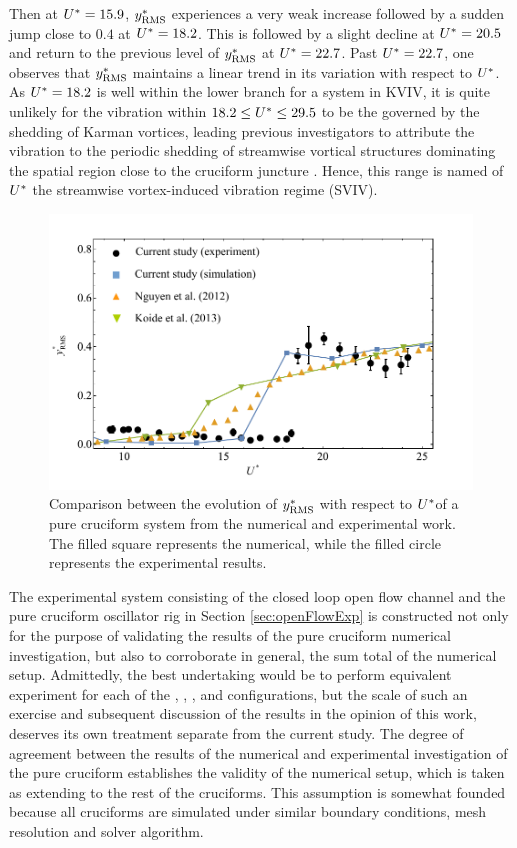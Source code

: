 \documentclass[oneside]{utmthesis}
\begin{document}
Then at $U^{*} = 15.9$, $y^{*}_{\text{RMS}}$ experiences a very weak increase followed by a sudden jump close to $0.4$ at $U^{*} = 18.2$. This is followed by a slight decline at $U^{*} = 20.5$ and return to the previous level of $y^{*}_{\text{RMS}}$ at $U^{*} = 22.7$. Past $U^{*} = 22.7$, one observes that $y^{*}_{\text{RMS}}$ maintains a linear trend in its variation with respect to $U^{*}$. As $U^{*} = 18.2$ is well within the lower branch for a system in KVIV, it is quite unlikely for the vibration within $18.2 \leq U^{*} \leq 29.5$ to be the governed by the shedding of Karman vortices, leading previous investigators to attribute the vibration to the periodic shedding of streamwise vortical structures dominating the spatial region close to the cruciform juncture \citep{Shirakashi1989,Hemsuwan2018b,Hemsuwan2018d}. Hence, this range is named of $U^{*}$ the streamwise vortex-induced vibration regime (SVIV).

\begin{figure}
  \centering
  \includegraphics[width=1\textwidth]{figs/expCompareAmp}
  \caption{Comparison between the evolution of $y^{*}_{\text{RMS}}$ with respect to $U^{*}$of a pure cruciform system from the numerical and experimental work. The filled square represents the numerical, while the filled circle represents the experimental results.}
  \label{fig:expCompareAmp}
\end{figure}

The experimental system consisting of the closed loop open flow channel and the pure cruciform oscillator rig in Section \ref{sec:openFlowExp} is constructed not only for the purpose of validating the results of the pure cruciform numerical investigation, but also to corroborate in general, the sum total of the numerical setup. Admittedly, the best undertaking would be to perform equivalent experiment for each of the \angfi{}, \angfo{}, \angth{}, \angtw{} and \angon{} configurations, but the scale of such an exercise and subsequent discussion of the results in the opinion of this work, deserves its own treatment separate from the current study. The degree of agreement between the results of the numerical and experimental investigation of the pure cruciform establishes the validity of the numerical setup, which is taken as extending to the rest of the cruciforms. This assumption is somewhat founded because all cruciforms are simulated under similar boundary conditions, mesh resolution and solver algorithm.
\end{document}
